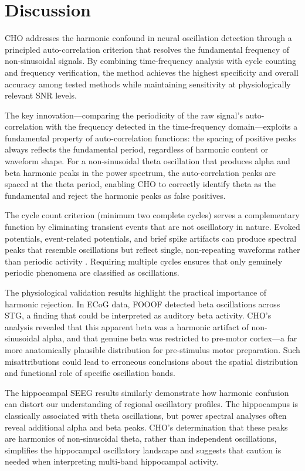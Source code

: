 \documentclass[12pt]{article}
\begin{document}
\section{Discussion}

CHO addresses the harmonic confound in neural oscillation detection through a principled auto-correlation criterion that resolves the fundamental frequency of non-sinusoidal signals. By combining time-frequency analysis with cycle counting and frequency verification, the method achieves the highest specificity and overall accuracy among tested methods while maintaining sensitivity at physiologically relevant SNR levels.

The key innovation---comparing the periodicity of the raw signal's auto-correlation with the frequency detected in the time-frequency domain---exploits a fundamental property of auto-correlation functions: the spacing of positive peaks always reflects the fundamental period, regardless of harmonic content or waveform shape. For a non-sinusoidal theta oscillation that produces alpha and beta harmonic peaks in the power spectrum, the auto-correlation peaks are spaced at the theta period, enabling CHO to correctly identify theta as the fundamental and reject the harmonic peaks as false positives.

The cycle count criterion (minimum two complete cycles) serves a complementary function by eliminating transient events that are not oscillatory in nature. Evoked potentials, event-related potentials, and brief spike artifacts can produce spectral peaks that resemble oscillations but reflect single, non-repeating waveforms rather than periodic activity \citep{crone2006induced}. Requiring multiple cycles ensures that only genuinely periodic phenomena are classified as oscillations.

The physiological validation results highlight the practical importance of harmonic rejection. In ECoG data, FOOOF detected beta oscillations across STG, a finding that could be interpreted as auditory beta activity. CHO's analysis revealed that this apparent beta was a harmonic artifact of non-sinusoidal alpha, and that genuine beta was restricted to pre-motor cortex---a far more anatomically plausible distribution for pre-stimulus motor preparation. Such misattributions could lead to erroneous conclusions about the spatial distribution and functional role of specific oscillation bands.

The hippocampal SEEG results similarly demonstrate how harmonic confusion can distort our understanding of regional oscillatory profiles. The hippocampus is classically associated with theta oscillations, but power spectral analyses often reveal additional alpha and beta peaks. CHO's determination that these peaks are harmonics of non-sinusoidal theta, rather than independent oscillations, simplifies the hippocampal oscillatory landscape and suggests that caution is needed when interpreting multi-band hippocampal activity.
\end{document}
